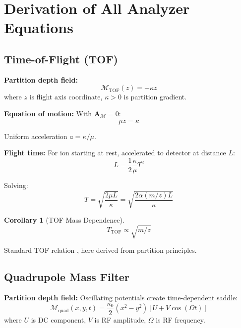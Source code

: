 \documentclass[twocolumn,10pt]{revtex4-2}
\newtheorem{corollary}[theorem]{Corollary}
\theoremstyle{definition}
\theoremstyle{remark}
\newcommand{\Mdepth}{\mathcal{M}}
\newcommand{\Apartition}{\mathbf{A}_{\Mdepth}}
\newcommand{\partinert}{\mu}
\begin{document}
\section{Derivation of All Analyzer Equations}
\label{sec:analyzer_equations}

\subsection{Time-of-Flight (TOF)}

\textbf{Partition depth field:}
\begin{equation}
\Mdepth_{\mathrm{TOF}}(z) = -\kappa z
\label{eq:tof_field}
\end{equation}
where $z$ is flight axis coordinate, $\kappa > 0$ is partition gradient.

\textbf{Equation of motion:} With $\Apartition = 0$:
\begin{equation}
\partinert\ddot{z} = \kappa
\label{eq:tof_eom}
\end{equation}

Uniform acceleration $a = \kappa/\partinert$.

\textbf{Flight time:} For ion starting at rest, accelerated to detector at distance $L$:
\begin{equation}
L = \frac{1}{2}\frac{\kappa}{\partinert}T^2
\end{equation}

Solving:
\begin{equation}
T = \sqrt{\frac{2\partinert L}{\kappa}} = \sqrt{\frac{2\alpha(m/z)L}{\kappa}}
\label{eq:tof_time}
\end{equation}

\begin{corollary}[TOF Mass Dependence]
\begin{equation}
\boxed{T_{\mathrm{TOF}} \propto \sqrt{m/z}}
\end{equation}
\end{corollary}

\noindent Standard TOF relation \cite{Wiley1955}, here derived from partition principles.

\subsection{Quadrupole Mass Filter}

\textbf{Partition depth field:} Oscillating potentials create time-dependent saddle:
\begin{equation}
\Mdepth_{\mathrm{quad}}(x, y, t) = \frac{\kappa_0}{2}(x^2 - y^2)[U + V\cos(\Omega t)]
\label{eq:quad_field}
\end{equation}
where $U$ is DC component, $V$ is RF amplitude, $\Omega$ is RF frequency.
\end{document}

